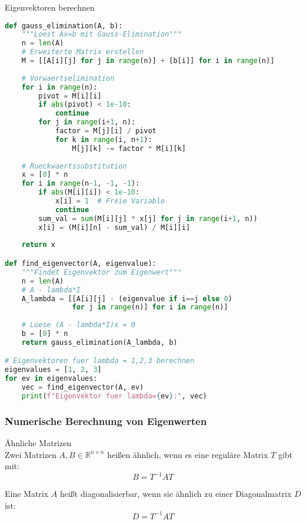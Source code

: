 \begin{examplecode}{Eigenvektoren berechnen}
\begin{lstlisting}[language=Python, style=basesmol]
def gauss_elimination(A, b):
    """Loest Ax=b mit Gauss-Elimination"""
    n = len(A)
    # Erweiterte Matrix erstellen
    M = [[A[i][j] for j in range(n)] + [b[i]] for i in range(n)]
    
    # Vorwaertselimination
    for i in range(n):
        pivot = M[i][i]
        if abs(pivot) < 1e-10:
            continue
        for j in range(i+1, n):
            factor = M[j][i] / pivot
            for k in range(i, n+1):
                M[j][k] -= factor * M[i][k]
    
    # Rueckwaertssubstitution
    x = [0] * n
    for i in range(n-1, -1, -1):
        if abs(M[i][i]) < 1e-10:
            x[i] = 1  # Freie Variable
            continue
        sum_val = sum(M[i][j] * x[j] for j in range(i+1, n))
        x[i] = (M[i][n] - sum_val) / M[i][i]
    
    return x

def find_eigenvector(A, eigenvalue):
    """Findet Eigenvektor zum Eigenwert"""
    n = len(A)
    # A - lambda*I
    A_lambda = [[A[i][j] - (eigenvalue if i==j else 0) 
                for j in range(n)] for i in range(n)]
    
    # Loese (A - lambda*I)x = 0
    b = [0] * n
    return gauss_elimination(A_lambda, b)

# Eigenvektoren fuer lambda = 1,2,3 berechnen
eigenvalues = [1, 2, 3]
for ev in eigenvalues:
    vec = find_eigenvector(A, ev)
    print(f"Eigenvektor fuer lambda={ev}:", vec)
\end{lstlisting}
\end{examplecode}



\subsubsection{Numerische Berechnung von Eigenwerten}

\begin{concept}{Ähnliche Matrizen}\\
Zwei Matrizen $A,B \in \mathbb{R}^{n\times n}$ heißen ähnlich, wenn es eine reguläre Matrix $T$ gibt mit:
$$B = T^{-1}AT$$

Eine Matrix $A$ heißt diagonalisierbar, wenn sie ähnlich zu einer Diagonalmatrix $D$ ist:
$$D = T^{-1}AT$$
\end{concept}

